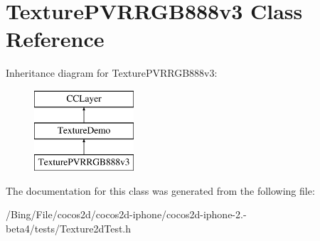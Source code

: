 \hypertarget{interface_texture_p_v_r_r_g_b888v3}{\section{Texture\-P\-V\-R\-R\-G\-B888v3 Class Reference}
\label{interface_texture_p_v_r_r_g_b888v3}
}
Inheritance diagram for Texture\-P\-V\-R\-R\-G\-B888v3\-:\begin{figure}[H]
\begin{center}
\leavevmode
\includegraphics[height=3.000000cm]{interface_texture_p_v_r_r_g_b888v3}
\end{center}
\end{figure}


The documentation for this class was generated from the following file\-:\begin{DoxyCompactItemize}
\item 
/\-Bing/\-File/cocos2d/cocos2d-\/iphone/cocos2d-\/iphone-\/2.-\/beta4/tests/Texture2d\-Test.\-h\end{DoxyCompactItemize}
